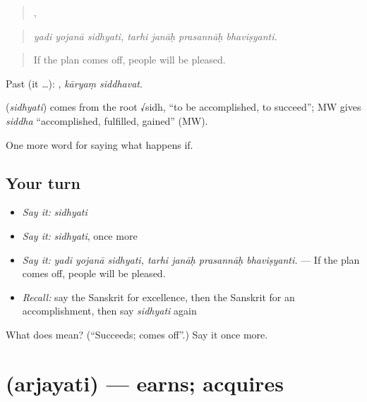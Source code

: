 \begin{quote}
  ,    
\end{quote}

\begin{quote}
\emph{yadi yojanā sidhyati, tarhi janāḥ prasannāḥ bhaviṣyanti.}
\end{quote}

\begin{quote}
If the plan comes off, people will be pleased.
\end{quote}

Past (it …):  , \emph{kāryaṃ siddhavat}.

\begin{cousinweb}
\textbf{} (\emph{sidhyati}) comes from the root √sidh, \textquotedblleft{}to be accomplished, to succeed\textquotedblright{}; MW gives \emph{siddha} \textquotedblleft{}accomplished, fulfilled, gained\textquotedblright{} (MW).
\end{cousinweb}

\begin{grammarlens}[title={What you've built}]
One more word for saying what happens if.
\end{grammarlens}

\subsection*{Your turn}
\begin{itemize}
\raggedright
  \item \emph{Say it:} \emph{sidhyati}
  \item \emph{Say it:} \emph{sidhyati}, once more
  \item \emph{Say it:} \emph{yadi yojanā sidhyati, tarhi janāḥ prasannāḥ bhaviṣyanti.} — If the plan comes off, people will be pleased.
  \item \emph{Recall:} say the Sanskrit for excellence, then the Sanskrit for an accomplishment, then say \emph{sidhyati} again
\end{itemize}

\begin{tcolorbox}[breakable,colback=teal!4,colframe=teal!35!black,title={Before you move on}]
What does  mean? (\textquotedblleft{}Succeeds; comes off\textquotedblright{}.) Say it once more.
\end{tcolorbox}
\section[\texorpdfstring{\sk{अर्जयति} (arjayati)}{अर्जयति (arjayati)}]{ (arjayati) — earns; acquires}

